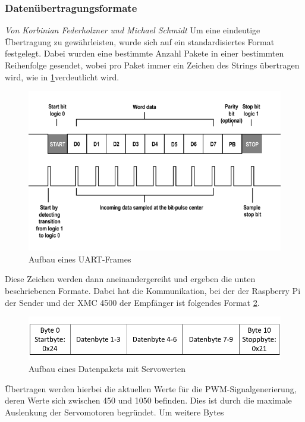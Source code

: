 \documentclass[12pt,a4paper,bibliography=totoc,listof=totoc]{scrartcl}
\begin{document}
\subsubsection{Datenübertragungsformate}
\textit{Von Korbinian Federholzner und Michael Schmidt}\newline
Um eine eindeutige Übertragung zu gewährleisten, wurde sich auf ein standardisiertes Format festgelegt. 
Dabei wurden eine bestimmte Anzahl Pakete in einer bestimmten Reihenfolge gesendet, wobei pro Paket immer 
ein Zeichen des Strings übertragen wird, wie in \ref{fig:UARTFrame}verdeutlicht wird.
\begin{figure}[htbp]
	\centering
	\includegraphics[scale = 0.5]{pics/Uartframe}
	\caption{Aufbau eines UART-Frames\cite {electricimp}}
	\label{fig:UARTFrame}
\end{figure}
Diese Zeichen werden dann aneinandergereiht und ergeben die unten beschriebenen Formate. Dabei hat die 
Kommunikation, bei der der Raspberry Pi der Sender und der XMC 4500 der Empfänger ist folgendes Format 
\ref{fig:UART Servo}.
\begin{figure}[htbp]
	\centering
	\includegraphics[scale = 0.5]{pics/Uartservo}
	\caption{Aufbau eines Datenpakets mit Servowerten}
	\label{fig:UART Servo}
\end{figure}
Übertragen werden hierbei die aktuellen Werte für die PWM-Signalgenerierung, deren Werte sich zwischen 
450 und 1050 befinden. Dies ist durch die maximale Auslenkung der Servomotoren begründet. Um weitere Bytes 
\end{document}
